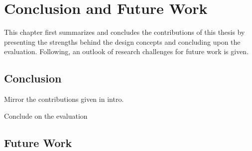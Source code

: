 \chapter{Conclusion and Future Work}
\label{chap:conclusion_futurework}

This chapter first summarizes and concludes the contributions of this thesis by presenting the strengths behind the design concepts and concluding upon the evaluation. Following, an outlook of research challenges for future work is given.


\section{Conclusion}
\label{sec:conclusion}
Mirror the contributions given in intro. 

Conclude on the evaluation 
\blindtext

\section{Future Work}
\label{sec:future_work}
\blindtext